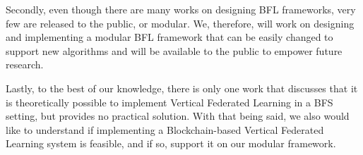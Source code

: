 Secondly, even though there are many works on designing BFL frameworks, very few are released to the public, or modular. We, therefore, will work on designing and implementing a modular BFL framework that can be easily changed to support new algorithms and will be available to the public to empower future research.

Lastly, to the best of our knowledge, there is only one work \cite{10.48550/arxiv.1912.04859} that discusses that it is theoretically possible to implement Vertical Federated Learning in a BFS setting, but provides no practical solution. With that being said, we also would like to understand if implementing a Blockchain-based Vertical Federated Learning system is feasible, and if so, support it on our modular framework.




